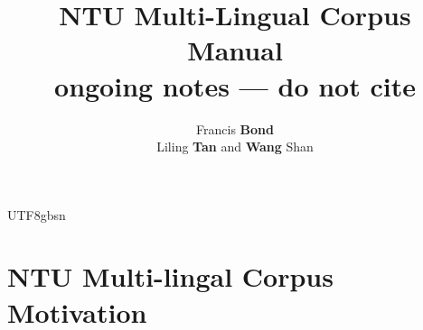 \documentclass[12pt]{book} %
\title{NTU Multi-Lingual Corpus Manual
\\ \huge ongoing notes --- do not cite}
\author{Francis \textbf{Bond}
  \\ Liling \textbf{Tan} and \textbf{Wang} Shan}
\newcommand{\ja}[1]{\CJKfamily{min}#1\CJKfamily{gbsn}}
\begin{document}
\begin{CJK}{UTF8}{gbsn}
\maketitle
\tableofcontents{}
\chapter{NTU Multi-lingal Corpus Motivation}



\end{CJK}
\end{document}
